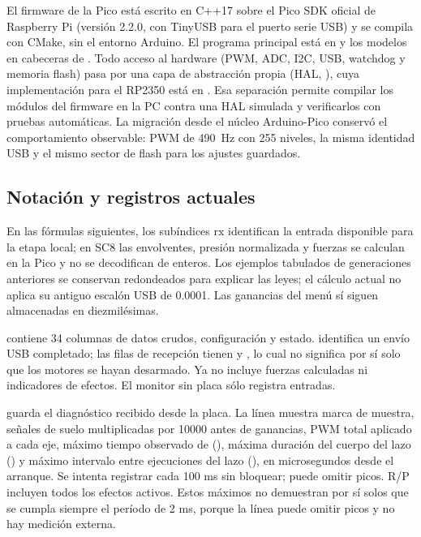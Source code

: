 El firmware de la Pico está escrito en C++17 sobre el Pico SDK oficial de Raspberry Pi \cite{picosdk} (versión 2.2.0, con TinyUSB para el puerto serie USB) y se compila con CMake, sin el entorno Arduino. El programa principal está en  y los modelos en cabeceras de . Todo acceso al hardware (PWM, ADC, I2C, USB, watchdog y memoria flash) pasa por una capa de abstracción propia (HAL, ), cuya implementación para el RP2350 está en . Esa separación permite compilar los módulos del firmware en la PC contra una HAL simulada y verificarlos con pruebas automáticas. La migración desde el núcleo Arduino-Pico conservó el comportamiento observable: PWM de 490~Hz con 255 niveles, la misma identidad USB y el mismo sector de flash para los ajustes guardados.

\subsection{Notación y registros actuales}
En las fórmulas siguientes, los subíndices $\mathrm{rx}$ identifican la entrada disponible para la etapa local; en SC8 las envolventes, presión normalizada y fuerzas se calculan en la Pico y no se decodifican de enteros. Los ejemplos tabulados de generaciones anteriores se conservan redondeados para explicar las leyes; el cálculo actual no aplica su antiguo escalón USB de 0.0001. Las ganancias del menú sí siguen almacenadas en diezmilésimas.

 contiene 34 columnas de datos crudos, configuración y estado.  identifica un envío USB completado; las filas de recepción tienen  y , lo cual no significa por sí solo que los motores se hayan desarmado. Ya no incluye fuerzas calculadas ni indicadores de efectos. El monitor sin placa sólo registra entradas.

 guarda el diagnóstico recibido desde la placa. La línea  muestra marca de muestra, señales de suelo multiplicadas por 10000 antes de ganancias, PWM total aplicado a cada eje, máximo tiempo observado de  (), máxima duración del cuerpo del lazo () y máximo intervalo entre ejecuciones del lazo (), en microsegundos desde el arranque. Se intenta registrar cada 100 ms sin bloquear; puede omitir picos. R/P incluyen todos los efectos activos. Estos máximos no demuestran por sí solos que se cumpla siempre el período de 2 ms, porque la línea puede omitir picos y no hay medición externa.

